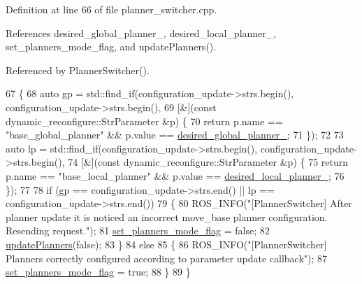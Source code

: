 Definition at line 66 of file planner\+\_\+switcher.\+cpp.



References desired\+\_\+global\+\_\+planner\+\_\+, desired\+\_\+local\+\_\+planner\+\_\+, set\+\_\+planners\+\_\+mode\+\_\+flag, and update\+Planners().



Referenced by Planner\+Switcher().


\begin{DoxyCode}
67 \{
68   \textcolor{keyword}{auto} gp = std::find\_if(configuration\_update->strs.begin(), configuration\_update->strs.begin(),
69                          [&](\textcolor{keyword}{const} dynamic\_reconfigure::StrParameter &p) \{
70                            \textcolor{keywordflow}{return} p.name == \textcolor{stringliteral}{"base\_global\_planner"} && p.value == 
      \hyperlink{classmove__base__z__client_1_1PlannerSwitcher_a004c15858f0a6b9abcd8211d58a7e34c}{desired\_global\_planner\_};
71                          \});
72 
73   \textcolor{keyword}{auto} lp = std::find\_if(configuration\_update->strs.begin(), configuration\_update->strs.begin(),
74                          [&](\textcolor{keyword}{const} dynamic\_reconfigure::StrParameter &p) \{
75                            \textcolor{keywordflow}{return} p.name == \textcolor{stringliteral}{"base\_local\_planner"} && p.value == 
      \hyperlink{classmove__base__z__client_1_1PlannerSwitcher_ae47bd6c9c70b27cddcb394f26bb9372d}{desired\_local\_planner\_};
76                          \});
77 
78   \textcolor{keywordflow}{if} (gp == configuration\_update->strs.end() || lp == configuration\_update->strs.end())
79   \{
80     ROS\_INFO(\textcolor{stringliteral}{"[PlannerSwitcher] After planner update it is noticed an incorrect move\_base planner
       configuration. Resending request."});
81     \hyperlink{classmove__base__z__client_1_1PlannerSwitcher_a74c0b5c21064a868700288e759446ac5}{set\_planners\_mode\_flag} = \textcolor{keyword}{false};
82     \hyperlink{classmove__base__z__client_1_1PlannerSwitcher_a189ac8c027169a111c7d8e14d864752f}{updatePlanners}(\textcolor{keyword}{false});
83   \}
84   \textcolor{keywordflow}{else}
85   \{
86     ROS\_INFO(\textcolor{stringliteral}{"[PlannerSwitcher] Planners correctly configured according to parameter update callback"});
87     \hyperlink{classmove__base__z__client_1_1PlannerSwitcher_a74c0b5c21064a868700288e759446ac5}{set\_planners\_mode\_flag} = \textcolor{keyword}{true};
88   \}
89 \}
\end{DoxyCode}


